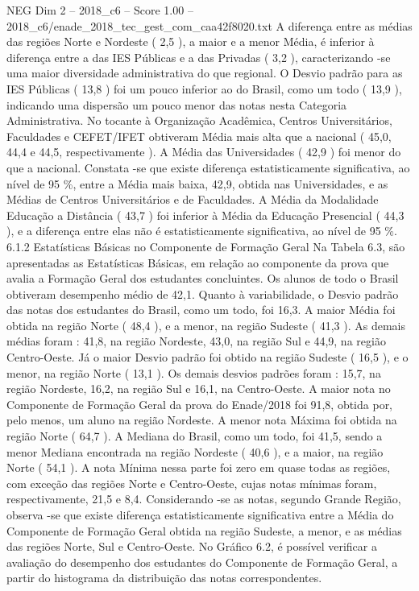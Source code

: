 \begin{textsample}{NEG Dim 2 – 2018\_c6 – Score 1.00 – 2018\_c6/enade\_2018\_tec\_gest\_com\_caa42f8020.txt}
A diferença entre as médias das regiões Norte e Nordeste ( 2,5 ), a maior e a menor Média, é inferior à diferença entre a das IES Públicas e a das Privadas ( 3,2 ), caracterizando -se uma maior diversidade administrativa do que regional.
O Desvio padrão para as IES Públicas ( 13,8 ) foi um pouco inferior ao do Brasil, como um todo ( 13,9 ), indicando uma dispersão um pouco menor das notas nesta Categoria Administrativa.
No tocante à Organização Acadêmica, Centros Universitários, Faculdades e CEFET/IFET obtiveram Média mais alta que a nacional ( 45,0, 44,4 e 44,5, respectivamente ).
A Média das Universidades ( 42,9 ) foi menor do que a nacional.
Constata -se que existe diferença estatisticamente significativa, ao nível de 95 \%, entre a Média mais baixa, 42,9, obtida nas Universidades, e as Médias de Centros Universitários e de Faculdades.
A Média da Modalidade Educação a Distância ( 43,7 ) foi inferior à Média da Educação Presencial ( 44,3 ), e a diferença entre elas não é estatisticamente significativa, ao nível de 95 \%. 6.1.2 Estatísticas Básicas no Componente de Formação Geral Na Tabela 6.3, são apresentadas as Estatísticas Básicas, em relação ao componente da prova que avalia a Formação Geral dos estudantes concluintes.
Os alunos de todo o Brasil obtiveram desempenho médio de 42,1.
Quanto à variabilidade, o Desvio padrão das notas dos estudantes do Brasil, como um todo, foi 16,3.
A maior Média foi obtida na região Norte ( 48,4 ), e a menor, na região Sudeste ( 41,3 ).
As demais médias foram : 41,8, na região Nordeste, 43,0, na região Sul e 44,9, na região Centro-Oeste.
Já o maior Desvio padrão foi obtido na região Sudeste ( 16,5 ), e o menor, na região Norte ( 13,1 ).
Os demais desvios padrões foram : 15,7, na região Nordeste, 16,2, na região Sul e 16,1, na Centro-Oeste.
A maior nota no Componente de Formação Geral da prova do Enade/2018 foi 91,8, obtida por, pelo menos, um aluno na região Nordeste.
A menor nota Máxima foi obtida na região Norte ( 64,7 ).
A Mediana do Brasil, como um todo, foi 41,5, sendo a menor Mediana encontrada na região Nordeste ( 40,6 ), e a maior, na região Norte ( 54,1 ).
A nota Mínima nessa parte foi zero em quase todas as regiões, com exceção das regiões Norte e Centro-Oeste, cujas notas mínimas foram, respectivamente, 21,5 e 8,4.
Considerando -se as notas, segundo Grande Região, observa -se que existe diferença estatisticamente significativa entre a Média do Componente de Formação Geral obtida na região Sudeste, a menor, e as médias das regiões Norte, Sul e Centro-Oeste.
No Gráfico 6.2, é possível verificar a avaliação do desempenho dos estudantes do Componente de Formação Geral, a partir do histograma da distribuição das notas correspondentes.

\end{textsample}
